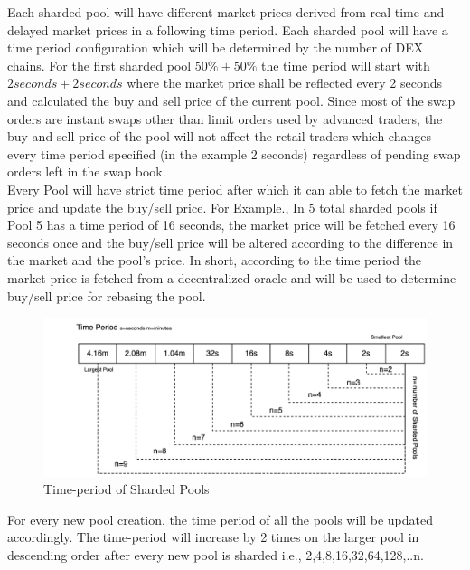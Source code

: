 \documentclass[10pt]{article}
\begin{document}
Each sharded pool will have different market prices derived from real time and delayed market prices in a following time period. Each sharded pool will have a time period configuration which will be determined by the number of DEX chains. For the first sharded pool $50\% + 50\%$ the time period will start with $2 seconds + 2 seconds$ where the market price shall be reflected every 2 seconds and calculated the buy and sell price of the current pool. Since most of the swap orders are instant swaps other than limit orders used by advanced traders, the buy and sell price of the pool will not affect the retail traders which changes every time period specified (in the example 2 seconds) regardless of pending swap orders left in the swap book.\\

Every Pool will have strict time period after which it can able to fetch the market price and update the buy/sell price. For Example., In 5 total sharded pools if Pool 5 has a time period of 16 seconds, the market price will be fetched every 16 seconds once and the buy/sell price will be altered according to the difference in the market and the pool's price. In short, according to the time period the market price is fetched from a decentralized oracle and will be used to determine buy/sell price for rebasing the pool. \\



\begin{figure}[H]
\begin{center}
\includegraphics[width=\textwidth]{timeperiod-pools}
\caption{Time-period of Sharded Pools}
\end{center}
\end{figure}

For every new pool creation, the time period of all the pools will be updated accordingly. The time-period will increase by 2 times on the larger pool in descending order after every new pool is sharded i.e., 2,4,8,16,32,64,128,..n. 
\end{document}
